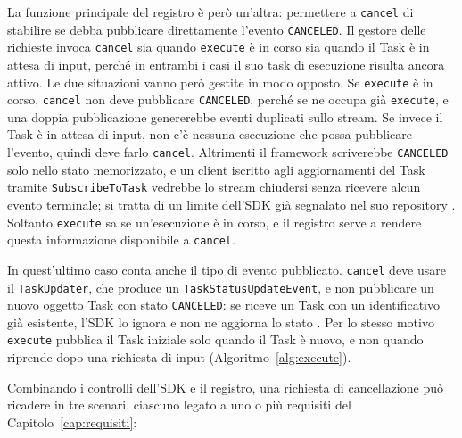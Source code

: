 La funzione principale del registro è però un'altra: permettere a \texttt{cancel} di stabilire se debba pubblicare direttamente l'evento \texttt{CANCELED}. Il gestore delle richieste invoca \texttt{cancel} sia quando \texttt{execute} è in corso sia quando il Task è in attesa di input, perché in entrambi i casi il suo task di esecuzione risulta ancora attivo. Le due situazioni vanno però gestite in modo opposto. Se \texttt{execute} è in corso, \texttt{cancel} non deve pubblicare \texttt{CANCELED}, perché se ne occupa già \texttt{execute}, e una doppia pubblicazione genererebbe eventi duplicati sullo stream. Se invece il Task è in attesa di input, non c'è nessuna esecuzione che possa pubblicare l'evento, quindi deve farlo \texttt{cancel}. Altrimenti il framework scriverebbe \texttt{CANCELED} solo nello stato memorizzato, e un client iscritto agli aggiornamenti del Task tramite \texttt{SubscribeToTask} vedrebbe lo stream chiudersi senza ricevere alcun evento terminale; si tratta di un limite dell'SDK già segnalato nel suo repository \cite{a2apythonissue1175}. Soltanto \texttt{execute} sa se un'esecuzione è in corso, e il registro serve a rendere questa informazione disponibile a \texttt{cancel}.

In quest'ultimo caso conta anche il tipo di evento pubblicato. \texttt{cancel} deve usare il \texttt{TaskUpdater}, che produce un \texttt{TaskStatusUpdateEvent}, e non pubblicare un nuovo oggetto Task con stato \texttt{CANCELED}: se riceve un Task con un identificativo già esistente, l'SDK lo ignora e non ne aggiorna lo stato \cite{a2apythonsdk}. Per lo stesso motivo \texttt{execute} pubblica il Task iniziale solo quando il Task è nuovo, e non quando riprende dopo una richiesta di input (Algoritmo~\ref{alg:execute}).

Combinando i controlli dell'SDK e il registro, una richiesta di cancellazione può ricadere in tre scenari, ciascuno legato a uno o più requisiti del Capitolo~\ref{cap:requisiti}:

